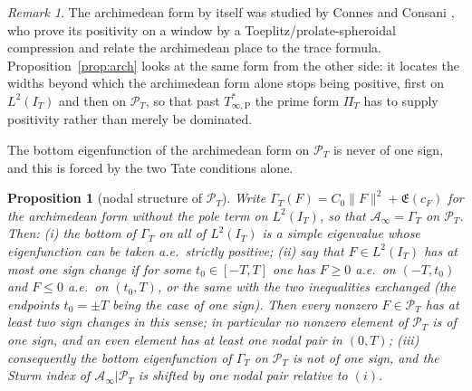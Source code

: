 \documentclass[11pt]{amsart}
\newtheorem{proposition}[theorem]{Proposition}
\theoremstyle{definition}
\theoremstyle{remark}
\newtheorem{remark}[theorem]{Remark}
\newcommand{\PT}{\mathcal P_T}
\newcommand{\IT}{I_T}
\newcommand{\cF}{c_F}
\newcommand{\Lev}{\mathfrak E}
\newcommand{\Ainf}{\mathcal A_\infty}
\newcommand{\PiT}{\Pi_T}
\begin{document}
\begin{remark}
The archimedean form by itself was studied by Connes and Consani \cite{ConnesConsani2021}, who prove
its positivity on a window by a Toeplitz/prolate-spheroidal compression and relate the archimedean
place to the trace formula. Proposition~\ref{prop:arch} looks at the same form from the other side:
it locates the widths beyond which the archimedean form alone stops being positive, first on
$L^2(I_T)$ and then on $\PT$, so that past $T^*_{\infty,\mathrm P}$ the prime form $\PiT$ has to
supply positivity rather than merely be dominated.
\end{remark}

The bottom eigenfunction of the archimedean form on $\PT$ is never of one sign, and this is forced
by the two Tate conditions alone.

\begin{proposition}[nodal structure of $\PT$]\label{prop:nodes}
Write $\Gamma_T(F)=C_0\|F\|^2+\Lev(\cF)$ for the archimedean form without the pole term on
$L^2(\IT)$, so that $\Ainf=\Gamma_T$ on $\PT$. Then:
\emph{(i)} the bottom of $\Gamma_T$ on all of $L^2(\IT)$ is a simple eigenvalue whose
eigenfunction can be taken a.e.\ strictly positive;
\emph{(ii)} say that $F\in L^2(\IT)$ has \emph{at most one sign change} if for some
$t_0\in[-T,T]$ one has $F\ge0$ a.e.\ on $(-T,t_0)$ and $F\le0$ a.e.\ on $(t_0,T)$, or the same
with the two inequalities exchanged (the endpoints $t_0=\pm T$ being the case of one sign).
Then every nonzero $F\in\PT$ has at least two sign changes in this sense; in particular no
nonzero element of $\PT$ is of one sign, and an even element has at least one nodal pair in
$(0,T)$;
\emph{(iii)} consequently the bottom eigenfunction of $\Gamma_T$ on $\PT$ is not of one sign,
and the Sturm index of $\Ainf|\PT$ is shifted by one nodal pair relative to $(i)$.
\end{proposition}
\end{document}

